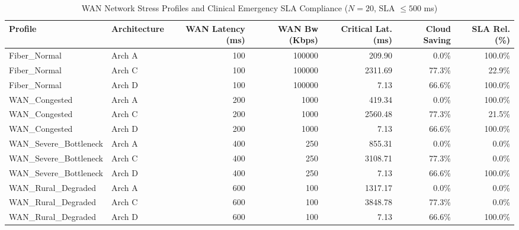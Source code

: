 \begin{table}[t]
\centering
\caption{WAN Network Stress Profiles and Clinical Emergency SLA Compliance ($N=20$, SLA $\leq 500$ ms)}
\label{tab:network_stress}
\begin{tabular}{llrrrrr}
\toprule
\textbf{Profile} & \textbf{Architecture} & \textbf{WAN Latency (ms)} & \textbf{WAN Bw (Kbps)} & \textbf{Critical Lat. (ms)} & \textbf{Cloud Saving} & \textbf{SLA Rel. (\%)} \\
\midrule
Fiber\_Normal & Arch A & 100 & 100000 & 209.90 & 0.0\% & 100.0\% \\
Fiber\_Normal & Arch C & 100 & 100000 & 2311.69 & 77.3\% & 22.9\% \\
Fiber\_Normal & Arch D & 100 & 100000 & 7.13 & 66.6\% & 100.0\% \\
WAN\_Congested & Arch A & 200 & 1000 & 419.34 & 0.0\% & 100.0\% \\
WAN\_Congested & Arch C & 200 & 1000 & 2560.48 & 77.3\% & 21.5\% \\
WAN\_Congested & Arch D & 200 & 1000 & 7.13 & 66.6\% & 100.0\% \\
WAN\_Severe\_Bottleneck & Arch A & 400 & 250 & 855.31 & 0.0\% & 0.0\% \\
WAN\_Severe\_Bottleneck & Arch C & 400 & 250 & 3108.71 & 77.3\% & 0.0\% \\
WAN\_Severe\_Bottleneck & Arch D & 400 & 250 & 7.13 & 66.6\% & 100.0\% \\
WAN\_Rural\_Degraded & Arch A & 600 & 100 & 1317.17 & 0.0\% & 0.0\% \\
WAN\_Rural\_Degraded & Arch C & 600 & 100 & 3848.78 & 77.3\% & 0.0\% \\
WAN\_Rural\_Degraded & Arch D & 600 & 100 & 7.13 & 66.6\% & 100.0\% \\
\bottomrule
\end{tabular}
\end{table}
